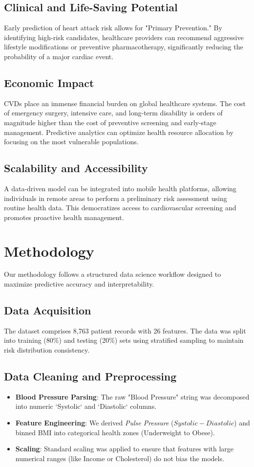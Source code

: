 \documentclass[12pt]{article}
\begin{document}
\subsection{Clinical and Life-Saving Potential}
Early prediction of heart attack risk allows for "Primary Prevention." By identifying high-risk candidates, healthcare providers can recommend aggressive lifestyle modifications or preventive pharmacotherapy, significantly reducing the probability of a major cardiac event.

\subsection{Economic Impact}
CVDs place an immense financial burden on global healthcare systems. The cost of emergency surgery, intensive care, and long-term disability is orders of magnitude higher than the cost of preventive screening and early-stage management. Predictive analytics can optimize health resource allocation by focusing on the most vulnerable populations.

\subsection{Scalability and Accessibility}
A data-driven model can be integrated into mobile health platforms, allowing individuals in remote areas to perform a preliminary risk assessment using routine health data. This democratizes access to cardiovascular screening and promotes proactive health management.

\section{Methodology}
Our methodology follows a structured data science workflow designed to maximize predictive accuracy and interpretability.

\subsection{Data Acquisition}
The dataset comprises 8,763 patient records with 26 features. The data was split into training (80\%) and testing (20\%) sets using stratified sampling to maintain risk distribution consistency.

\subsection{Data Cleaning and Preprocessing}
\begin{itemize}
    \item \textbf{Blood Pressure Parsing}: The raw "Blood Pressure" string was decomposed into numeric `Systolic` and `Diastolic` columns.
    \item \textbf{Feature Engineering}: We derived \textit{Pulse Pressure} ($Systolic - Diastolic$) and binned BMI into categorical health zones (Underweight to Obese).
    \item \textbf{Scaling}: Standard scaling was applied to ensure that features with large numerical ranges (like Income or Cholesterol) do not bias the models.
\end{itemize}
\end{document}
